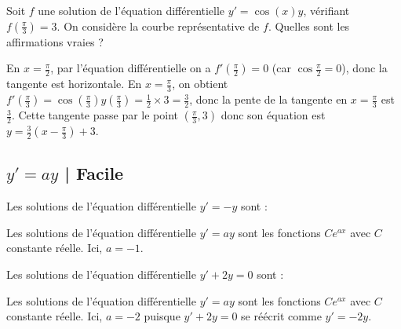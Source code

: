 \begin{question}
Soit $f$ une solution de l'équation différentielle $y' = \cos(x) y$, vérifiant $f(\frac\pi3)=3$. On considère la courbe représentative de \(f\).
Quelles sont les affirmations vraies ?
\begin{answers}
\end{answers}
\begin{explanations}
En $x=\frac\pi2$, par l'équation différentielle on a $f'(\frac\pi2) = 0$ (car $\cos\frac\pi2=0$), donc la tangente est horizontale.
En $x=\frac\pi3$, on obtient $f'(\frac\pi3) = \cos(\frac\pi3) y(\frac\pi3) = \frac12 \times 3 = \frac32$, donc la pente de la tangente en $x=\frac\pi3$ est $\frac32$. Cette tangente passe par le point $(\frac\pi3,3)$ donc son équation est $y=\frac32(x-\frac\pi3) + 3$.
\end{explanations}
\end{question}



\subsection{$y'=ay$ | Facile}

\begin{question}
Les solutions de l'équation différentielle $y'=-y$ sont :
\begin{answers}
\end{answers}
\begin{explanations}
Les solutions de l'équation différentielle $y'=ay$ sont les fonctions $C e^{ax}$ avec $C$ constante réelle. Ici, $a=-1$.
\end{explanations}
\end{question}

\begin{question}
Les solutions de l'équation différentielle $y'+2y=0$ sont :
\begin{answers}
\end{answers}
\begin{explanations}
Les solutions de l'équation différentielle $y'=ay$ sont les fonctions $C e^{ax}$ avec $C$ constante réelle. Ici, $a=-2$ puisque $y' +2y = 0$ se réécrit comme $y' = -2y$.
\end{explanations}
\end{question}


